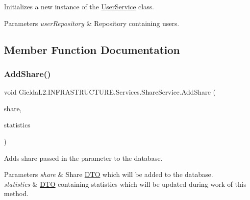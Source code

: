 Initializes a new instance of the \mbox{\hyperlink{class_gielda_l2_1_1_i_n_f_r_a_s_t_r_u_c_t_u_r_e_1_1_services_1_1_user_service}{User\+Service}} class. 


\begin{DoxyParams}{Parameters}
{\em user\+Repository} & Repository containing users.\\
\hline
\end{DoxyParams}


\subsection{Member Function Documentation}
\mbox{\label{class_gielda_l2_1_1_i_n_f_r_a_s_t_r_u_c_t_u_r_e_1_1_services_1_1_share_service_a9b880f273e42a748d5f0ee70d8c4ee0a}} 
\subsubsection{\texorpdfstring{AddShare()}{AddShare()}}
{\footnotesize\ttfamily void Gielda\+L2.\+I\+N\+F\+R\+A\+S\+T\+R\+U\+C\+T\+U\+R\+E.\+Services.\+Share\+Service.\+Add\+Share (\begin{DoxyParamCaption}\item[{\mbox{\hyperlink{class_gielda_l2_1_1_i_n_f_r_a_s_t_r_u_c_t_u_r_e_1_1_d_t_o_1_1_share_d_t_o}{Share\+D\+TO}}}]{share,  }\item[{\mbox{\hyperlink{class_gielda_l2_1_1_i_n_f_r_a_s_t_r_u_c_t_u_r_e_1_1_d_t_o_1_1_statistics_d_t_o}{Statistics\+D\+TO}}}]{statistics }\end{DoxyParamCaption})}



Adds share passed in the parameter to the database. 


\begin{DoxyParams}{Parameters}
{\em share} & Share \mbox{\hyperlink{namespace_gielda_l2_1_1_i_n_f_r_a_s_t_r_u_c_t_u_r_e_1_1_d_t_o}{D\+TO}} which will be added to the database.\\
\hline
{\em statistics} & \mbox{\hyperlink{namespace_gielda_l2_1_1_i_n_f_r_a_s_t_r_u_c_t_u_r_e_1_1_d_t_o}{D\+TO}} containing statistics which will be updated during work of this method.\\
\hline
\end{DoxyParams}


